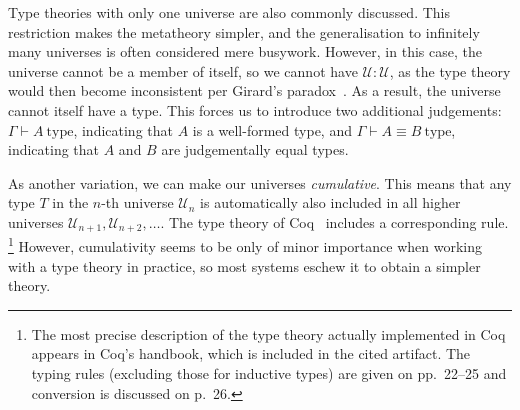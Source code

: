 \documentclass{scrartcl}
\theoremstyle{definition}
\newcommand{\type}{\mathrm{type}}
\newcommand{\Univ}{\mathcal{U}}
\begin{document}
Type theories with only one universe are also commonly discussed.
This restriction makes the metatheory simpler, and the generalisation to infinitely many universes is often considered mere busywork.
However, in this case, the universe cannot be a member of itself, so we cannot have $\Univ : \Univ$, as the type theory would then become inconsistent per Girard's paradox~\cite{girard:thesis,DBLP:conf/tlca/Hurkens95}.
As a result, the universe cannot itself have a type.
This forces us to introduce two additional judgements: $Γ ⊢ A~\type$, indicating that $A$ is a well-formed type, and $Γ ⊢ A ≡ B~\type$, indicating that $A$ and $B$ are judgementally equal types.

As another variation, we can make our universes \emph{cumulative}.
This means that any type $T$ in the $n$-th universe $\Univ_{n}$ is automatically also included in all higher universes $\Univ_{n+1}, \Univ_{n+2}, \dots$.
The type theory of Coq~\cite{coq} includes a corresponding rule.%
\footnote{The most precise description of the type theory actually implemented in Coq appears in Coq's handbook, which is included in the cited artifact.
  The typing rules (excluding those for inductive types) are given on pp.\ 22--25 and conversion is discussed on p.\ 26.}
However, cumulativity seems to be only of minor importance when working with a type theory in practice, so most systems eschew it to obtain a simpler theory.


\end{document}
